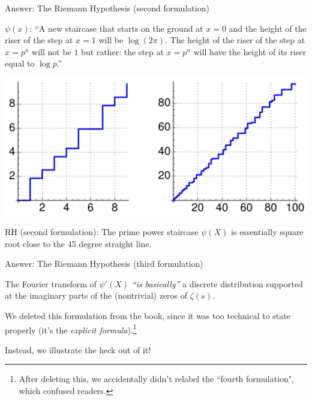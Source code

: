\documentclass{beamer}
\begin{document}
\begin{frame}{Answer: The Riemann Hypothesis  (second formulation)}

  $\psi(x)$: ``A new staircase that starts on the ground at $x=0$ and the height of the
  riser of the step at $x=1$ will be $\log(2\pi)$. The height of the
  riser of the step at $x=p^n$ will not be $1$
  but rather: the step at $x=p^n$ will have the height of its riser
  equal to $\log p$.''

  \begin{center}
    \includegraphics[height=.4\textheight]{pics/psi}
  \end{center}

  \begin{block}{}
    RH (second formulation): The prime power staircase $\psi(X)$ is essentially square root close
    to the 45 degree straight line.
  \end{block}

\end{frame}

\begin{frame}{Answer: The Riemann Hypothesis (third formulation)}
  \begin{block}{}
    The Fourier transform
    of $\psi'(X)$ \emph{``is basically''}
    a discrete distribution supported at the imaginary parts of the
    (nontrivial) zeros of $\zeta(s)$.

  \end{block}
  \vfill

  We deleted this formulation from the book, since it was too technical to state properly (it's the {\em explicit formula}).\footnote{After deleting this, we accidentally didn't relabel the ``fourth formulation", which confused readers.}

  \vfill

  Instead, we illustrate the heck out of it!

  \vfill

\end{frame}
\end{document}
